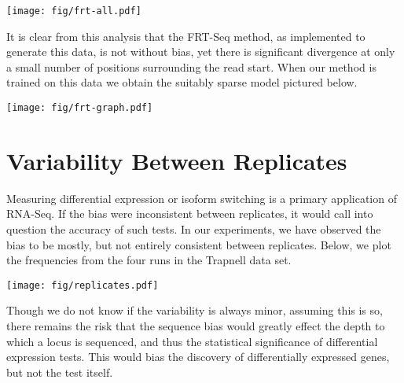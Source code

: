 \documentclass[letterpaper]{article}
\begin{document}
\begin{center}
\texttt{[image: fig/frt-all.pdf]}
\end{center}

It is clear from this analysis that the FRT-Seq method, as implemented to
generate this data, is not without bias, yet there is significant divergence at
only a small number of positions surrounding the read start. When our method is
trained on this data we obtain the suitably sparse model pictured below.

\begin{center}
\texttt{[image: fig/frt-graph.pdf]}
\end{center}



\section{Variability Between Replicates}

Measuring differential expression or isoform switching is a primary application of
RNA-Seq. If the bias were inconsistent between replicates, it would call into
question the accuracy of such tests. In our experiments, we have observed the
bias to be mostly, but not entirely consistent between replicates. Below, we
plot the frequencies from the four runs in the Trapnell data set.

\begin{center}
\texttt{[image: fig/replicates.pdf]}
\end{center}

Though we do not know if the variability is always minor, assuming this is so,
there remains the risk that the sequence bias would greatly effect the depth to
which a locus is sequenced, and thus the statistical significance of
differential expression tests. This would bias the discovery of differentially
expressed genes, but not the test itself.



\end{document}
